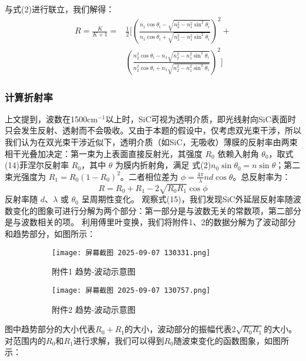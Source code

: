 \documentclass[withoutpreface,bwprint]{cumcmthesis}
\begin{document}
与式(2)进行联立，我们解得：
	\begin{equation}
	\begin{split}
	R = \frac{K}{K + 1} = &\frac{1}{2}\bigg[ \left( \frac{n_1 \cos\theta_i - \sqrt{n_2^2 - n_1^2 \sin^2\theta_i}}{n_1 \cos\theta_i + \sqrt{n_2^2 - n_1^2 \sin^2\theta_i}} \right)^2 + \\
	&\left( \frac{n_2^2 \cos\theta_i - n_1 \sqrt{n_2^2 - n_1^2 \sin^2\theta_i}}{n_2^2 \cos\theta_i + n_1 \sqrt{n_2^2 - n_1^2 \sin^2\theta_i}} \right)^2 \bigg]
	\end{split}
	\end{equation}
\subsubsection{计算折射率}
上文提到，波数在1500cm$^{-1}$以上时，SiC可视为透明介质，即光线射向SiC表面时只会发生反射、透射而不会吸收。又由于本题的假设中，仅考虑双光束干涉，所以我们认为在双光束干涉近似下，透明介质（如SiC，无吸收）薄膜的反射率由两束相干光叠加决定：第一束为上表面直接反射光，其强度 $ R_0 $ 依赖入射角 $ \theta_0 $，取式(14)菲涅尔反射率 $ R_0 $，其中 $ \theta $ 为膜内折射角，满足 式(2)$ n_0 \sin\theta_0 = n \sin\theta $；第二束光强度为 $ R_1 = R_0 (1 - R_0)^2 $。二者相位差为 $ \phi = \frac{4\pi}{\lambda} n d \cos\theta $。总反射率为：
\begin{equation}
R = R_0 + R_1 - 2\sqrt{R_0 R_1} \cos\phi
\end{equation}
反射率随 $ d $、$ \lambda $ 或 $ \theta_0 $ 呈周期性变化。
观察式(15)，我们发现SiC外延层反射率随波数变化的图象可进行分解为两个部分：第一部分是与波数无关的常数项，第二部分是与波数相关的项。
利用傅里叶变换，我们将附件1、2的数据分解为了波动部分和趋势部分，如图所示：
\begin{figure}[H]
  \centering
  \begin{subfigure}[b]{0.49\linewidth}
    \texttt{[image: 屏幕截图 2025-09-07 130331.png]}
    \caption{附件1 趋势-波动示意图}
    \label{fig:att1}
  \end{subfigure}
  \hfill
  \begin{subfigure}[b]{0.49\linewidth}
    \texttt{[image: 屏幕截图 2025-09-07 130757.png]}
    \caption{附件2 趋势-波动示意图}
    \label{fig:att2}
  \end{subfigure}
  \caption{}
  \label{fig:double}
\end{figure}
图中趋势部分的大小代表$R_0+R_1$的大小，波动部分的振幅代表$2\sqrt{R_0 R_1}$的大小。
对范围内的$R_0$和$R_1$进行求解，我们可以得到$R_0$随波束变化的函数图象，如图所示：
\end{document}
